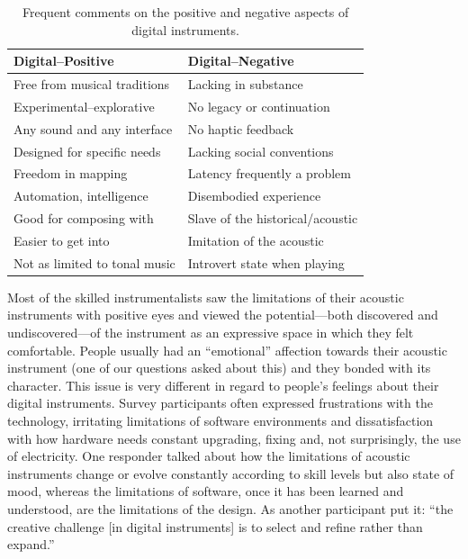 \begin{table}[t]
\centering
{}
\caption{Frequent comments on the positive and negative aspects of digital instruments.}
\vspace{3pt} \noindent
\begin{tabular}{ll}
\toprule
\textbf{Digital--Positive}     & \textbf{Digital--Negative}  \\
\midrule  
Free from musical traditions \hspace{1cm} & Lacking in substance  \\

Experimental--explorative & No legacy or continuation  \\

Any sound and any interface & No haptic feedback  \\

Designed for specific needs & Lacking social conventions  \\

Freedom in mapping & Latency frequently a problem  \\

Automation, intelligence & Disembodied experience  \\

Good for composing with & Slave of the historical/acoustic  \\

Easier to get into & Imitation of the acoustic  \\

Not as limited to tonal music & Introvert state when playing  \\
\bottomrule
\end{tabular}
\end{table}

Most of the skilled instrumentalists saw the limitations of their acoustic
instruments with positive eyes and viewed the potential---both discovered and
undiscovered---of the instrument as an expressive space in which they felt
comfortable. People usually had an ``emotional'' affection towards their acoustic
instrument (one of our questions asked about this) and they bonded with its
character. This issue is very different in regard to people's feelings about
their digital instruments. Survey participants often expressed frustrations with
the technology, irritating limitations of software environments and
dissatisfaction with how hardware needs constant upgrading, fixing and, not
surprisingly, the use of electricity. One responder talked about how the
limitations of acoustic instruments change or evolve constantly according to
skill levels but also state of mood, whereas the limitations of software, once it
has been learned and understood, are the limitations of the design. As another
participant put it: ``the creative challenge [in digital instruments] is to
select and refine rather than expand.''

